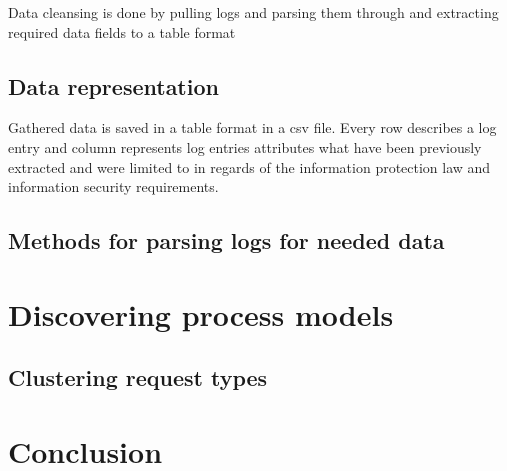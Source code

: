 \documentclass[a4paper, 12pt]{article}
\let\stdsection\section
\renewcommand\section{\newpage\stdsection}
\begin{document}
Data cleansing is done by pulling logs and parsing them through and extracting required data fields to a table format 

\subsection{Data representation}
Gathered data is saved in a table format in a csv file. Every row describes a log entry and column represents log entries attributes what have been previously extracted and were limited to in regards of the information protection law and information security requirements. 

\subsection{Methods for parsing logs for needed data}

\section{Discovering process models}

\subsection{Clustering request types}


\section{Conclusion}
\label{Conclusion} 
\pagebreak


\footnotesize
{}
\end{document}
